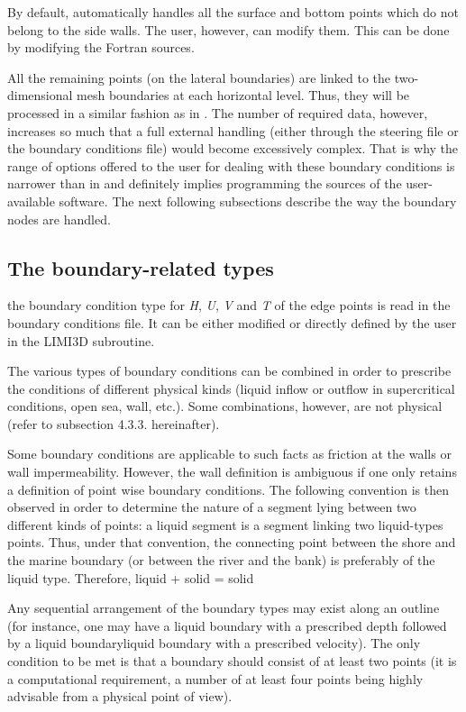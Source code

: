 By default,  automatically handles all the surface and bottom points
which do not belong to the side walls. The user, however, can modify them. This
can be done by modifying the Fortran sources.

All the remaining points (on the lateral boundaries) are linked to the
two-dimensional mesh boundaries at each horizontal level. Thus, they will be
processed in a similar fashion as in . The number of required data,
however, increases so much that a full external handling (either through the
steering file or the boundary conditions file) would become excessively
complex. That is why the range of options offered to the user for dealing with
these boundary conditions is narrower than in  and definitely implies
programming the sources of the user-available software. The next following
subsections describe the way the boundary nodes are handled.


\subsection{The boundary-related types}

the boundary condition type for \textit{H}, \textit{U}, \textit{V} and
\textit{T} of the edge points is read in the boundary conditions file. It can
be either modified or directly defined by the user in the LIMI3D
subroutine.

The various types of boundary conditions can be combined in order to prescribe
the conditions of different physical kinds (liquid inflow or outflow in
supercritical conditions, open sea, wall, etc.). Some combinations, however,
are not physical (refer to subsection 4.3.3. hereinafter).

Some boundary conditions are applicable to such facts as friction at the walls
or wall impermeability. However, the wall definition is ambiguous if one only
retains a definition of point wise boundary conditions. The following
convention is then observed in order to determine the nature of a segment lying
between two different kinds of points: a liquid segment is a segment linking
two liquid-types points. Thus, under that convention, the connecting point
between the shore and the marine boundary (or between the river and the bank)
is preferably of the liquid type. Therefore, liquid + solid = solid

Any sequential arrangement of the boundary types may exist along an outline
(for instance, one may have a liquid boundary with a prescribed depth followed
by a liquid boundaryliquid boundary with a prescribed velocity). The only
condition to be met is that a boundary should consist of at least two points
(it is a computational requirement, a number of at least four points being
highly advisable from a physical point of view).



